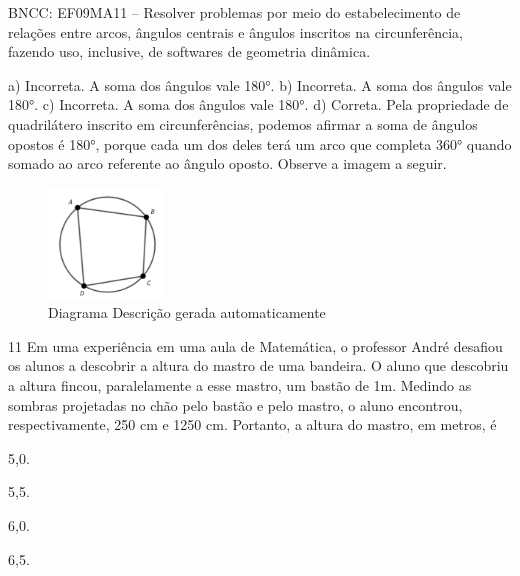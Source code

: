 {{{\begin{escolha}
{{{{{\begin{escolha}
\begin{escolha}
{\begin{q°}
{{BNCC: EF09MA11 -- Resolver problemas por meio do estabelecimento de
relações entre arcos, ângulos centrais e ângulos inscritos na
circunferência, fazendo uso, inclusive, de softwares de geometria
dinâmica.

a) Incorreta. A soma dos ângulos vale 180°.
b) Incorreta. A soma dos ângulos vale 180°.
c) Incorreta. A soma dos ângulos vale 180°.
d) Correta. Pela propriedade de quadrilátero inscrito em circunferências, 
podemos afirmar a soma de ângulos opostos é 180°, porque cada um 
dos deles terá um arco que completa 360° quando somado ao arco referente 
ao ângulo oposto. Observe a imagem a seguir.

\begin{figure}
\centering
\includegraphics[width=1.22917in,height=1.15573in]{./_SAEB_9_MAT/media/image254.png}
\caption{Diagrama Descrição gerada automaticamente}
\end{figure}
}

\num{11} Em uma experiência em uma aula de Matemática, o professor André
desafiou os alunos a descobrir a altura do mastro de uma bandeira. O aluno
que descobriu a altura fincou, paralelamente a esse mastro, um bastão de
1m. Medindo as sombras projetadas no chão pelo bastão e pelo mastro,
o aluno encontrou, respectivamente, 250 cm e 1250 cm. Portanto, a altura do
mastro, em metros, é

\begin{escolha}

  \item 5,0.

  \item 5,5.

  \item 6,0.

  \item 6,5.

\end{escolha}

}
\end{q°}}
\end{escolha}
\end{escolha}}}}}}
\end{escolha}}}}
